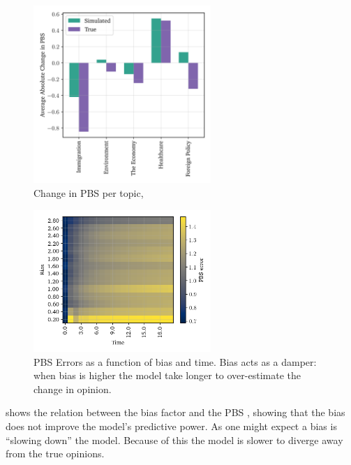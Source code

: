 \begin{figure}[ht]
	\begin{center}
		\includegraphics[width=0.6\textwidth]{Figures/per_topic_change.png}
	\end{center}
	\caption{Change in PBS per topic, }\label{fig:per_topic}
\end{figure}

\begin{figure}[ht]
	\centering

	\includegraphics[width=0.6\textwidth]{Figures/bias_time_imshow.png}
	\hspace{1em}
	\caption{PBS Errors as a function of bias and time. Bias acts as a damper: when bias is higher the model take longer to over-estimate the change in opinion.}
	\label{fig:bias_slowdown}
\end{figure}

 shows the relation between the bias factor and the PBS
, showing that the bias does not improve the model's predictive power. As
one might expect a bias is ``slowing down'' the model. Because of this the
model is slower to diverge away from the true opinions.

